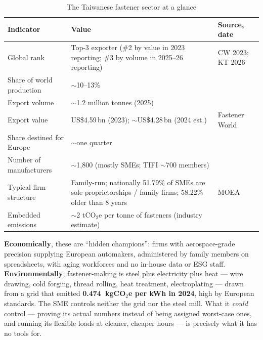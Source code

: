 \begin{table}[htbp]
\caption{The Taiwanese fastener sector at a glance}
\label{tab:sector}
\small
\begin{tabularx}{\textwidth}{@{}p{}Xp{}@{}}
\toprule
\textbf{Indicator} & \textbf{Value} & \textbf{Source, date} \\
\midrule
Global rank & Top-3 exporter (\#2 by value in 2023 reporting; \#3 by volume in 2025--26 reporting) & CW 2023\cite{cw}; KT 2026\cite{ktimes} \\
Share of world production & $\sim$10--13\% & \cite{ktimes,goebel} \\
Export volume & $\sim$1.2 million tonnes (2025) & \cite{ktimes} \\
Export value & US\$4.59\,bn (2023); $\sim$US\$4.28\,bn (2024 est.) & Fastener World\cite{fwexport} \\
Share destined for Europe & $\sim$one quarter & \cite{cw} \\
Number of manufacturers & $\sim$1,800 (mostly SMEs; TIFI $\sim$700 members) & \cite{goebel} \\
Typical firm structure & Family-run; nationally 51.79\% of SMEs are sole proprietorships / family firms; 58.22\% older than 8 years & MOEA\cite{moea} \\
Embedded emissions & $\sim$2 tCO$_2$e per tonne of fasteners (industry estimate) & \cite{specialinsert} \\
\bottomrule
\end{tabularx}
\end{table}

\textbf{Economically}, these are ``hidden champions'': firms with
aerospace-grade precision supplying European automakers, administered by family
members on spreadsheets, with aging workforces and no in-house data or ESG
staff. \textbf{Environmentally}, fastener-making is steel plus electricity plus
heat --- wire drawing, cold forging, thread rolling, heat treatment,
electroplating --- drawn from a grid that emitted \textbf{0.474~kgCO$_2$e per
kWh in 2024}\cite{moeaea}, high by European standards. The SME controls neither
the grid nor the steel mill. What it \emph{could} control --- proving its actual
numbers instead of being assigned worst-case ones, and running its flexible
loads at cleaner, cheaper hours --- is precisely what it has no tools for.
